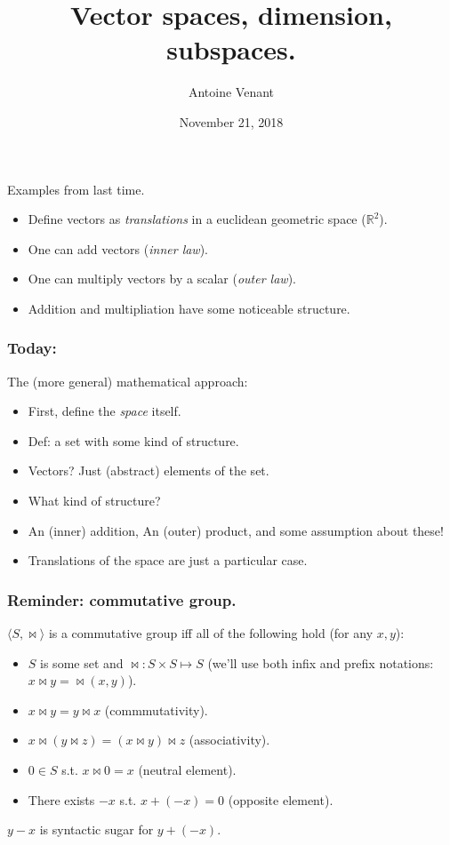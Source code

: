 \documentclass{beamer}
\begin{document}
\title{Vector spaces, dimension, subspaces.} 
\author{Antoine Venant}
\date{November 21, 2018}
\maketitle


\begin{frame}{Examples from last time.}
  
  \begin{itemize}
  \item Define vectors as \emph{translations} in a euclidean geometric space ($\mathbb{R}^2$).
  \item One can add vectors (\emph{inner law}).
  \item One can multiply vectors by a scalar (\emph{outer law}).
  \item Addition and multipliation have some noticeable structure.
  \end{itemize}
\end{frame}

\begin{frame}
  \frametitle{Today:}
  The (more general) mathematical approach:
  \begin{itemize}
  \item First, define the \emph{space} itself.
  \item Def: a set with some kind of structure.
  \item Vectors? Just (abstract) elements of the set.
  \item What kind of structure?
  \item An (inner) addition, An (outer) product, and some assumption about these!
  \item Translations of the space are just a particular case.
  \end{itemize}  
\end{frame}

\begin{frame}
  \frametitle{Reminder: commutative group.}

  $\langle S, \bowtie \rangle$ is a commutative group iff all of the following hold (for any $x, y$):
  \begin{itemize}
  \item $S$ is some set and $\bowtie: S \times S \mapsto S$ (we'll use both infix and prefix notations: $x \bowtie y = \bowtie(x, y)$).
  \item $x \bowtie y = y \bowtie x$ (commmutativity).
  \item $x \bowtie (y \bowtie z) = (x \bowtie y) \bowtie z$ (associativity).
  \item $0 \in S$ s.t. $x \bowtie 0 = x$ (neutral element).
  \item There exists $-x$ s.t. $x + (-x) = 0$ (opposite element).
  \end{itemize}

  \begin{center}
    $y - x$ is syntactic sugar for $y + (-x)$.
  \end{center}
\end{frame}
\end{document}
